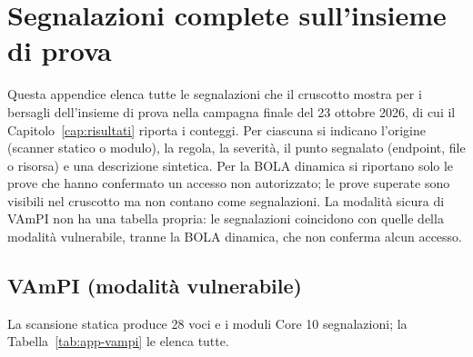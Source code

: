 
\chapter{Segnalazioni complete sull'insieme di prova}
\label{app:segnalazioni}

Questa appendice elenca tutte le segnalazioni che il cruscotto mostra per i bersagli
dell'insieme di prova nella campagna finale del 23 ottobre 2026, di cui il
Capitolo~\ref{cap:risultati} riporta i conteggi. Per ciascuna si indicano l'origine
(scanner statico o modulo), la regola, la severità, il punto segnalato (endpoint, file o
risorsa) e una descrizione sintetica. Per la BOLA dinamica si riportano solo le prove che
hanno confermato un accesso non autorizzato; le prove superate sono visibili nel cruscotto
ma non contano come segnalazioni. La modalità sicura di VAmPI non ha una tabella propria:
le segnalazioni coincidono con quelle della modalità vulnerabile, tranne la BOLA dinamica,
che non conferma alcun accesso.

\section*{VAmPI (modalità vulnerabile)}
La scansione statica produce 28 voci e i moduli Core 10 segnalazioni; la Tabella~\ref{tab:app-vampi} le elenca tutte.


